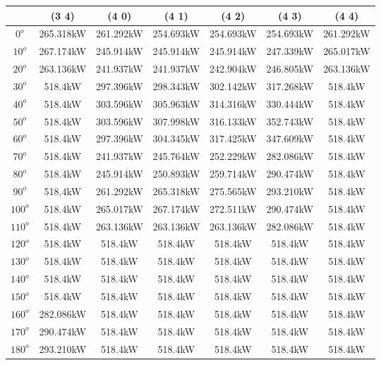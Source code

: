         \begin{table}[H]
        	\centering
        	\begin{tabular}{|c|c|c|c|c|c|c|} \hline
        			& (3 4)		& (4 0)		& (4 1)		& (4 2)		& (4 3)		& (4 4)		\\ \hline
		$0^o$	& 265.318kW	& 261.292kW	& 254.693kW	& 254.693kW	& 254.693kW	& 261.292kW	\\ \hline
		$10^o$	& 267.174kW	& 245.914kW	& 245.914kW	& 245.914kW	& 247.339kW	& 265.017kW	\\ \hline
		$20^o$	& 263.136kW	& 241.937kW	& 241.937kW	& 242.904kW	& 246.805kW	& 263.136kW	\\ \hline
		$30^o$	& 518.4kW	& 297.396kW	& 298.343kW	& 302.142kW	& 317.268kW	& 518.4kW	\\ \hline
		$40^o$	& 518.4kW	& 303.596kW	& 305.963kW	& 314.316kW	& 330.444kW	& 518.4kW	\\ \hline
		$50^o$	& 518.4kW	& 303.596kW	& 307.998kW	& 316.133kW	& 352.743kW	& 518.4kW	\\ \hline
		$60^o$	& 518.4kW	& 297.396kW	& 304.345kW	& 317.425kW	& 347.609kW	& 518.4kW	\\ \hline
		$70^o$	& 518.4kW	& 241.937kW	& 245.764kW	& 252.229kW	& 282.086kW	& 518.4kW	\\ \hline
		$80^o$	& 518.4kW	& 245.914kW	& 250.893kW	& 259.714kW	& 290.474kW	& 518.4kW	\\ \hline
		$90^o$	& 518.4kW	& 261.292kW	& 265.318kW	& 275.565kW	& 293.210kW	& 518.4kW	\\ \hline
		$100^o$	& 518.4kW	& 265.017kW	& 267.174kW	& 272.511kW	& 290.474kW	& 518.4kW	\\ \hline
		$110^o$	& 518.4kW	& 263.136kW	& 263.136kW	& 263.136kW	& 282.086kW	& 518.4kW	\\ \hline
		$120^o$	& 518.4kW	& 518.4kW	& 518.4kW	& 518.4kW	& 518.4kW	& 518.4kW	\\ \hline
		$130^o$	& 518.4kW	& 518.4kW	& 518.4kW	& 518.4kW	& 518.4kW	& 518.4kW	\\ \hline
		$140^o$	& 518.4kW	& 518.4kW	& 518.4kW	& 518.4kW	& 518.4kW	& 518.4kW	\\ \hline
		$150^o$	& 518.4kW	& 518.4kW	& 518.4kW	& 518.4kW	& 518.4kW	& 518.4kW	\\ \hline
		$160^o$	& 282.086kW	& 518.4kW	& 518.4kW	& 518.4kW	& 518.4kW	& 518.4kW	\\ \hline
		$170^o$	& 290.474kW	& 518.4kW	& 518.4kW	& 518.4kW	& 518.4kW	& 518.4kW	\\ \hline
		$180^o$	& 293.210kW	& 518.4kW	& 518.4kW	& 518.4kW	& 518.4kW	& 518.4kW	\\ \hline

\end{tabular}
\end{table}
